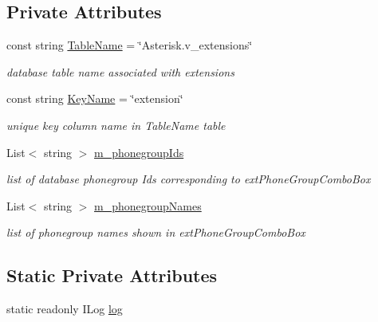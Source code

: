 \subsection*{Private Attributes}
\begin{DoxyCompactItemize}
\item 
const string \hyperlink{class_ias_pbx_config_1_1_extensions_a259337feb936fbf177fcc0c03863b710}{TableName} = \char`\"{}Asterisk.v\_\-extensions\char`\"{}
\begin{DoxyCompactList}\small\item\em database table name associated with extensions \item\end{DoxyCompactList}\item 
const string \hyperlink{class_ias_pbx_config_1_1_extensions_a005c298b2abc38d8c33bda8a9dfafdc2}{KeyName} = \char`\"{}extension\char`\"{}
\begin{DoxyCompactList}\small\item\em unique key column name in TableName table \item\end{DoxyCompactList}\item 
List$<$ string $>$ \hyperlink{class_ias_pbx_config_1_1_extensions_afc9ff97b0452641769562d9a8104cf20}{m\_\-phonegroupIds}
\begin{DoxyCompactList}\small\item\em list of database phonegroup Ids corresponding to extPhoneGroupComboBox \item\end{DoxyCompactList}\item 
List$<$ string $>$ \hyperlink{class_ias_pbx_config_1_1_extensions_a5f79a5d0c5d3fb9d6c6a5a808258499e}{m\_\-phonegroupNames}
\begin{DoxyCompactList}\small\item\em list of phonegroup names shown in extPhoneGroupComboBox \item\end{DoxyCompactList}\end{DoxyCompactItemize}
\subsection*{Static Private Attributes}
\begin{DoxyCompactItemize}
\item 
static readonly ILog \hyperlink{class_ias_pbx_config_1_1_extensions_ab43ad241e3cdaf1c1d00df49f8e1e3de}{log}
\end{DoxyCompactItemize}


